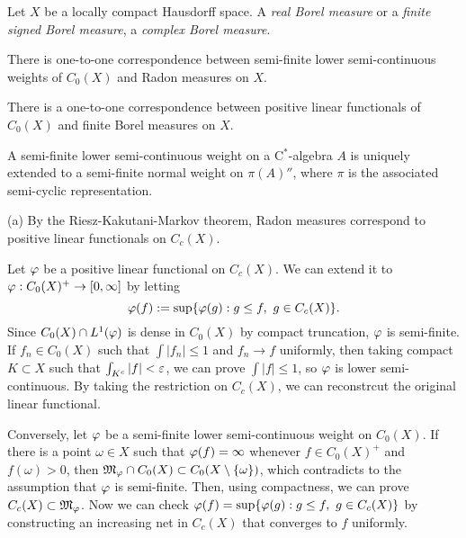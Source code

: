 \documentclass{../../large}
\begin{document}
\begin{prb}
Let $X$ be a locally compact Hausdorff space.
A \emph{real Borel measure} or a \emph{finite signed Borel measure}, a \emph{complex Borel measure}.

\begin{parts}
\item There is one-to-one correspondence between semi-finite lower semi-continuous weights of $C_0(X)$ and Radon measures on $X$.
\item There is a one-to-one correspondence between positive linear functionals of $C_0(X)$ and finite Borel measures on $X$.
\item A semi-finite lower semi-continuous weight on a C$^*$-algebra $A$ is uniquely extended to a semi-finite normal weight on $\pi(A)''$, where $\pi$ is the associated semi-cyclic representation.
\end{parts}
\end{prb}
\begin{pf}
(a)
By the Riesz-Kakutani-Markov theorem, Radon measures correspond to positive linear functionals on $C_c(X)$.

Let $\varphi$ be a positive linear functional on $C_c(X)$.
We can extend it to $\varphi:C_0(X)^+\to[0,\infty]$ by letting
\[\varphi(f):=\sup\{\varphi(g):g\le f,\ g\in C_c(X)\}.\]
Since $C_0(X)\cap L^1(\varphi)$ is dense in $C_0(X)$ by compact truncation, $\varphi$ is semi-finite.
If $f_n\in C_0(X)$ such that $\int|f_n|\le1$ and $f_n\to f$ uniformly, then taking compact $K\subset X$ such that $\int_{K^c}|f|<\varepsilon$, we can prove $\int|f|\le1$, so $\varphi$ is lower semi-continuous.
By taking the restriction on $C_c(X)$, we can reconstrcut the original linear functional.

Conversely, let $\varphi$ be a semi-finite lower semi-continuous weight on $C_0(X)$.
If there is a point $\omega\in X$ such that $\varphi(f)=\infty$ whenever $f\in C_0(X)^+$ and $f(\omega)>0$, then $\mathfrak{M}_\varphi\cap C_0(X)\subset C_0(X\setminus\{\omega\})$, which contradicts to the assumption that $\varphi$ is semi-finite.
Then, using compactness, we can prove $C_c(X)\subset\mathfrak{M}_\varphi$.
Now we can check $\varphi(f)=\sup\{\varphi(g):g\le f,\ g\in C_c(X)\}$ by constructing an increasing net in $C_c(X)$ that converges to $f$ uniformly.
\end{pf}
\end{document}
